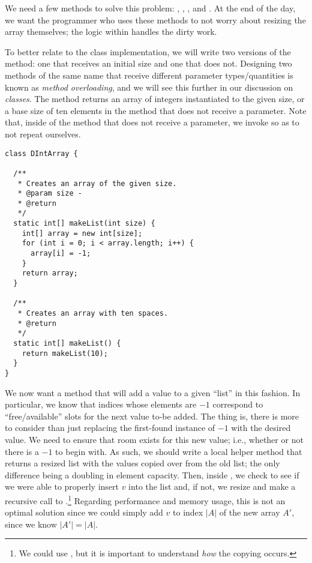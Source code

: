 We need a few methods to solve this problem: , , , and . At the end of the day, we want the programmer who uses these methods to not worry about resizing the array themselves; the logic within handles the dirty work.

To better relate to the  class implementation, we will write two versions of the  method: one that receives an initial size and one that does not. Designing two methods of the same name that receive different parameter types/quantities is known as \emph{method overloading}, and we will see this further in our discussion on \emph{classes}. The  method returns an array of integers instantiated to the given size, or a base size of ten elements in the method that does not receive a parameter. Note that, inside of the  method that does not receive a parameter, we invoke  so as to not repeat ourselves.

\begin{lstlisting}[language=MyJava]
class DIntArray {

  /**
   * Creates an array of the given size.
   * @param size - 
   * @return 
   */
  static int[] makeList(int size) {
    int[] array = new int[size];
    for (int i = 0; i < array.length; i++) {
      array[i] = -1;
    }
    return array;
  }

  /**
   * Creates an array with ten spaces.
   * @return 
   */
  static int[] makeList() {
    return makeList(10);
  }
}
\end{lstlisting}

We now want a method that will add a value to a given ``list'' in this fashion. In particular, we know that indices whose elements are $-1$ correspond to ``free/available'' slots for the next value to-be added. The thing is, there is more to consider than just replacing the first-found instance of $-1$ with the desired value. We need to ensure that room exists for this new value; i.e., whether or not there is a $-1$ to begin with. As such, we should write a local helper method that returns a resized list with the values copied over from the old list; the only difference being a doubling in element capacity. Then, inside , we check to see if we were able to properly insert $v$ into the list and, if not, we resize and make a recursive call to .\footnote{We could use , but it is important to understand \emph{how} the copying occurs.} Regarding performance and memory usage, this is not an optimal solution since we could simply add $v$ to index $|A|$ of the new array $A'$, since we know $|A'| = |A|$.

